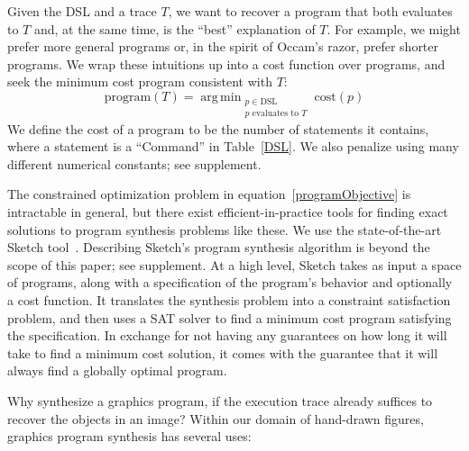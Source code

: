 \documentclass{article}
\DeclareMathOperator*{\argmin}{arg\,min} %
\newcommand{\remark}[1]{\textcolor{red}{[#1]}}
\begin{document}
Given the DSL and a trace $T$, we want to recover a program that both evaluates to $T$
and, at the same time, is the ``best'' explanation of $T$.
For example, we might prefer more general programs or, in the spirit of Occam's razor,
prefer shorter programs.
We wrap these intuitions up into a cost function over programs,
and seek the minimum cost program consistent with $T$:
\begin{equation}
  \text{program}(T) = \argmin_{\substack{p\in \text{DSL}\\p \text{ evaluates to } T}} \text{cost}(p)\label{programObjective}
\end{equation}
We define the
cost of a program to be the number of statements it contains, where a
statement is a ``Command'' in Table~\ref{DSL}.
We also penalize using many different numerical constants; see supplement.

The constrained optimization problem in
equation~\ref{programObjective} is intractable in general, but there
exist efficient-in-practice tools for finding exact solutions to
program synthesis problems like these. We use the state-of-the-art Sketch
tool~\cite{solar2008program}. Describing Sketch's program synthesis
algorithm is beyond the scope of this paper; see supplement.  At a
high level, Sketch takes as input a space of programs, along with a
specification of the program's behavior and optionally a cost
function.  It translates the synthesis problem into a constraint
satisfaction problem, and then uses a SAT solver to find a
minimum cost program satisfying the specification.  In exchange for
not having any guarantees on how long it will take to find a minimum
cost solution, it comes with the guarantee that it will always find a
globally optimal program.

Why synthesize a graphics program,
if the execution trace already suffices to recover the objects in an image?
Within our domain of hand-drawn figures, graphics program synthesis has several uses:
\end{document}
